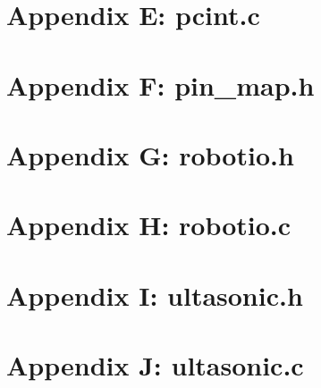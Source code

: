 \documentclass[letterpaper,11pt]{texMemo} %
\begin{document}
\section*{Appendix E: pcint.c}
\begin{tiny}

\end{tiny}
\newpage

\section*{Appendix F: pin\_map.h}
\begin{tiny}

\end{tiny}
\newpage

\section*{Appendix G: robotio.h}
\begin{tiny}

\end{tiny}
\newpage

\section*{Appendix H: robotio.c}
\begin{tiny}

\end{tiny}
\newpage

\section*{Appendix I: ultasonic.h}
\begin{tiny}

\end{tiny}
\newpage

\section*{Appendix J: ultasonic.c}
\begin{tiny}

\end{tiny}
\newpage
\end{document}
